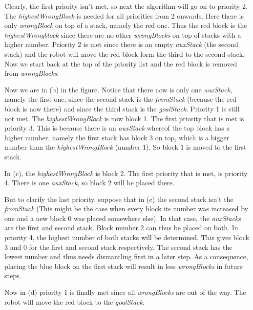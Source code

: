 \documentclass{article}
\begin{document}
	\par
	Clearly, the first priority isn't met, so next the algorithm will go on to priority 2. The \textit{highestWrongBlock} is needed for all priorities from 2 onwards. Here there is only \textit{wrongBlock} on top of a stack, namely the red one. Thus the red block is the \textit{highestWrongblock} since there are no other \textit{wrongBlocks} on top of stacks with a higher number. 
	Priority 2 is met since there is an empty \textit{auxStack} (the second stack) and the robot will move the red block form the third to the second stack. Now we start back at the top of the priority list and the red block is removed from \textit{wrongBlocks}.
	
	\par
	Now we are in (b) in the figure. Notice that there now is only one \textit{auxStack}, namely the first one, since the second stack is the \textit{fromStack} (because the red block is now there) and since the third stack is the \textit{goalStack}. Priority 1 is still not met. The \textit{highestWrongBlock} is now block 1. The first priority that is met is priority 3. This is because there is an \textit{auxStack} whereof the top block has a higher number, namely the first stack has block 3 on top, which is a bigger number than the \textit{highestWrongBlock} (number 1). So block 1 is moved to the first stack.
	
	\par
	In (c), the \textit{highestWrongBlock} is block 2. The first priority that is met, is priority 4. There is one \textit{auxStack}, so block 2 will be placed there. 
	
	\par But to clarify the last priority, suppose that in (c) the second stack isn't the \textit{fromStack} (This might be the case when every block its number was increased by one and a new block 0 was placed somewhere else). In that case, the \textit{auxStacks} are the first and second stack. Block number 2 can thus be placed on both. In priority 4, the highest number of both stacks will be determined. This gives block 3 and 0 for the first and second stack respectively. The second stack has the lowest number and thus needs dismantling first in a later step. As a consequence, placing the blue block on the first stack will result in less \textit{wrongBlocks} in future steps.
	
	\par Now in (d) priority 1 is finally met since all \textit{wrongBlocks} are out of the way. The robot will move the red block to the \textit{goalStack}. 
	
\end{document}
